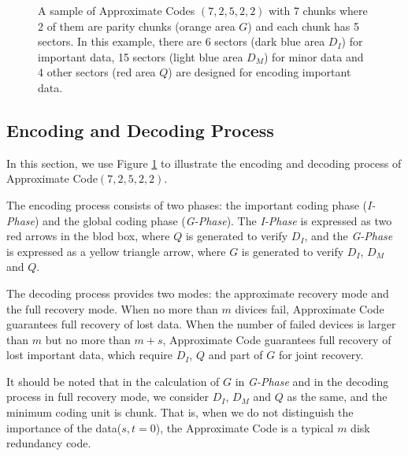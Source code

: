 \documentclass[sigconf]{acmart}
\begin{document}
\begin{figure}[h]
\centering
{}
\caption{A sample of Approximate Codes $(7,2,5,2,2)$ with 7 chunks where 2 of them are parity chunks (orange area $G$) and each chunk has 5 sectors. In this example, there are 6 sectors (dark blue area $D_I$) for important data, 15 sectors (light blue area $D_M$) for minor data and 4 other sectors (red area $Q$) are designed for encoding important data.}
\label{apcode-72522-v3}
\end{figure}

\subsection{Encoding and Decoding Process}
In this section, we use Figure \ref{apcode-72522-v3} to illustrate the encoding and decoding process of Approximate Code$(7,2,5,2,2)$.

The encoding process consists of two phases: the important coding phase (\emph{I-Phase}) and the global coding phase (\emph{G-Phase}). 
The \emph{I-Phase} is expressed as two red arrows in the blod box, where $Q$ is generated to verify $D_I$, and
the \emph{G-Phase} is expressed as a yellow triangle arrow, where $G$ is generated to verify $D_I$, $D_M$ and $Q$.

The decoding process provides two modes: the approximate recovery mode and the full recovery mode.
When no more than $m$ divices fail, Approximate Code guarantees full recovery of lost data.
When the number of failed devices is larger than $m$ but no more than $m+s$, Approximate Code guarantees full recovery of lost important data, which require $D_I$, $Q$ and part of $G$ for joint recovery.

It should be noted that in the calculation of $G$ in \emph{G-Phase} and in the decoding process in full recovery mode, we consider $D_I$, $D_M$ and $Q$ as the same, and the minimum coding unit is chunk. That is, when we do not distinguish the importance of the data($s,t = 0$), the Approximate Code is a typical $m$ disk redundancy code.
\end{document}
